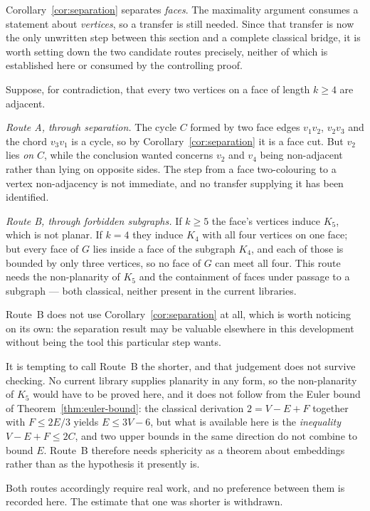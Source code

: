 \begin{remark}
\Sprose
Corollary~\ref{cor:separation} separates \emph{faces}. The maximality
argument consumes a statement about \emph{vertices}, so a transfer is still
needed. Since that transfer is now the only unwritten step between this
section and a complete classical bridge, it is worth setting down the two
candidate routes precisely, neither of which is established here or consumed
by the controlling proof.

Suppose, for contradiction, that every two vertices on a face of length
$k \ge 4$ are adjacent.

\emph{Route A, through separation.} The cycle $C$ formed by two face edges
$v_1v_2$, $v_2v_3$ and the chord $v_3v_1$ is a cycle, so by
Corollary~\ref{cor:separation} it is a face cut. But $v_2$ lies \emph{on}
$C$, while the conclusion wanted concerns $v_2$ and $v_4$ being
non-adjacent rather than lying on opposite sides. The step from a face
two-colouring to a vertex non-adjacency is not immediate, and no transfer
supplying it has been identified.

\emph{Route B, through forbidden subgraphs.} If $k \ge 5$ the face's
vertices induce $K_5$, which is not planar. If $k = 4$ they induce $K_4$
with all four vertices on one face; but every face of $G$ lies inside a face
of the subgraph $K_4$, and each of those is bounded by only three vertices,
so no face of $G$ can meet all four. This route needs the non-planarity of
$K_5$ and the containment of faces under passage to a subgraph --- both
classical, neither present in the current libraries.

Route~B does not use Corollary~\ref{cor:separation} at all, which is worth
noticing on its own: the separation result may be valuable elsewhere in this
development without being the tool this particular step wants.

It is tempting to call Route~B the shorter, and that judgement does not
survive checking. No current library supplies planarity in any form, so the
non-planarity of $K_5$ would have to be proved here, and it does not follow
from the Euler bound of Theorem~\ref{thm:euler-bound}: the classical
derivation $2 = V - E + F$ together with $F \le 2E/3$ yields $E \le 3V-6$,
but what is available here is the \emph{inequality} $V - E + F \le 2C$, and
two upper bounds in the same direction do not combine to bound $E$. Route~B
therefore needs sphericity as a theorem about embeddings rather than as the
hypothesis it presently is.

Both routes accordingly require real work, and no preference between them is
recorded here. The estimate that one was shorter is withdrawn.
\end{remark}

